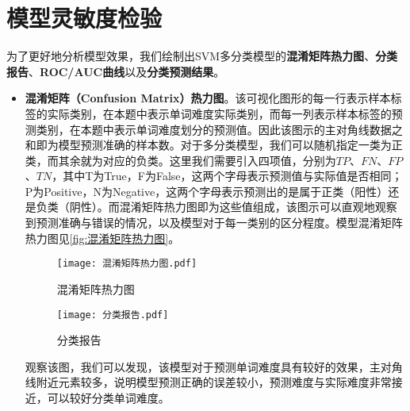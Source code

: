 \documentclass{MathModeling}
\begin{document}
	\section{模型灵敏度检验}\label{灵敏度分析}
	为了更好地分析模型效果，我们绘制出SVM多分类模型的\textbf{混淆矩阵热力图}、\textbf{分类报告}、\textbf{ROC/AUC曲线}以及\textbf{分类预测结果}。
	\begin{itemize}
		\item \textbf{混淆矩阵（Confusion Matrix）热力图}。该可视化图形的每一行表示样本标签的实际类别，在本题中表示单词难度实际类别，而每一列表示样本标签的预测类别，在本题中表示单词难度划分的预测值。因此该图示的主对角线数据之和即为模型预测准确的样本数。对于多分类模型，我们可以随机指定一类为正类，而其余就为对应的负类。这里我们需要引入四项值，分别为$TP$、$FN$、$FP$、$TN$，其中T为True，F为False，这两个字母表示预测值与实际值是否相同；P为Positive，N为Negative，这两个字母表示预测出的是属于正类（阳性）还是负类（阴性）。而混淆矩阵热力图即为这些值组成，该图示可以直观地观察到预测准确与错误的情况，以及模型对于每一类别的区分程度。模型混淆矩阵热力图见\textcolor{blue}{\cref{fig:混淆矩阵热力图}}。

		\begin{figure}[H]
			\centering
			\begin{minipage}{0.48\linewidth}
				\centering
				\texttt{[image: 混淆矩阵热力图.pdf]}
				\caption{混淆矩阵热力图}
				\label{fig:混淆矩阵热力图}
			\end{minipage}
			\begin{minipage}{0.48\linewidth}
				\centering
				\texttt{[image: 分类报告.pdf]}
				\caption{分类报告}
				\label{fig:分类报告}
			\end{minipage}
		\end{figure}

		观察该图，我们可以发现，该模型对于预测单词难度具有较好的效果，主对角线附近元素较多，说明模型预测正确的误差较小，预测难度与实际难度非常接近，可以较好分类单词难度。


\end{itemize}
\end{document}
